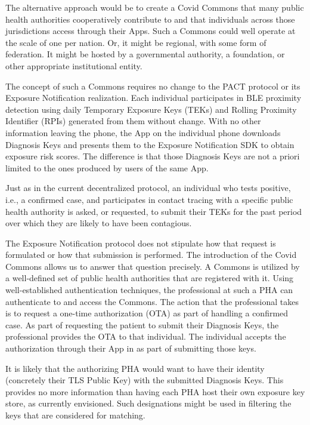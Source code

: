 The alternative approach would be to create a Covid Commons that many public health authorities cooperatively contribute to and that individuals across those jurisdictions access through their Apps.
Such a Commons could well operate at the scale of one per nation.
Or, it might be regional, with some form of federation.
It might be hosted by a governmental authority, a foundation, or other appropriate institutional entity.

The concept of such a Commons requires no change to the PACT protocol or its Exposure Notification realization.
Each individual participates in BLE proximity detection using daily Temporary Exposure Keys (TEKs) and Rolling Proximity Identifier (RPIs) generated from them without change.
With no other information leaving the phone, the App on the individual phone downloads Diagnosis Keys and presents them to the Exposure Notification SDK to obtain exposure risk scores.
The difference is that those Diagnosis Keys are not a priori limited to the ones produced by users of the same App.

Just as in the current decentralized protocol, an individual who tests positive, i.e., a confirmed case, and participates in contact tracing with a specific public health authority is asked, or requested, to submit their TEKs for the past period over which they are likely to have been contagious.

The Exposure Notification protocol does not stipulate how that request is formulated or how that submission is performed.
The introduction of the Covid Commons allows us to answer that question precisely.
A Commons is utilized by a well-defined set of public health authorities that are registered with it.
Using well-established authentication techniques, the professional at such a PHA can authenticate to and access the Commons.
The action that the professional takes is to request a one-time authorization (OTA) as part of handling a confirmed case.
As part of requesting the patient to submit their Diagnosis Keys, the professional provides the OTA to that individual.
The individual accepts the authorization through their App in as part of submitting those keys.

It is likely that the authorizing PHA would want to have their identity (concretely their TLS Public Key) with the submitted Diagnosis Keys.
This provides no more information than having each PHA host their own exposure key store, as currently envisioned.
Such designations might be used in filtering the keys that are considered for matching.

